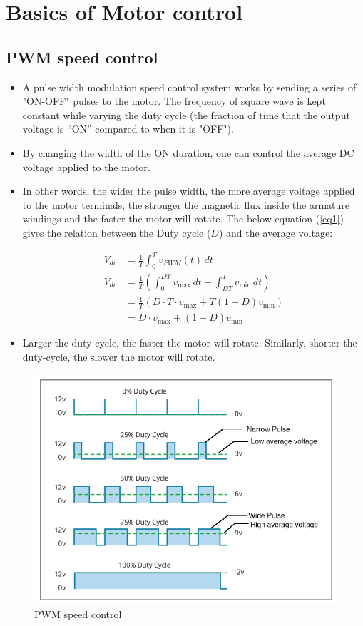 \chapter{Basics of Motor control} \label{Basics_motor_control}

\section{PWM speed control}
\begin{itemize}
    \item A pulse width modulation speed control system works by sending a series of "ON-OFF" pulses to the motor. The frequency of square wave is kept constant while varying the duty cycle (the fraction of time that the output voltage is “ON” compared to when it is "OFF").
    \item By changing the width of the ON duration, one can control the average DC voltage applied to the motor. 
    \item In other words, the wider the pulse width, the more average voltage applied to the motor terminals, the stronger the magnetic flux inside the armature windings and the faster the motor will rotate. The below equation (\ref{eq1}) gives the relation between the Duty cycle ($D$) and the average voltage:

\begin{align}
V_{dc}&={\frac {1}{T}}\int _{0}^{T}v_{PWM}(t)\,dt  \label{eq1} \\
V_{dc} &= {\frac {1}{T}}\left(\int _{0}^{DT}v_{\text{max}}\,dt+\int _{DT}^{T}v_{\text{min}}\,dt\right) \nonumber \\ \nonumber
&={\frac {1}{T}}\left(D\cdot T\cdot v_{\text{max}}+T\left(1-D\right)v_{\text{min}}\right)\\ \nonumber
&=D\cdot v_{\text{max}}+\left(1-D\right)v_{\text{min}} 
\end{align}

    \item Larger the duty-cycle, the faster the motor will rotate. Similarly, shorter the duty-cycle, the slower the motor will rotate.
\end{itemize}

\begin{figure}[h!]
\centering
\includegraphics[width=12cm]{./Figures/PWM_speed_control.png}
\caption{PWM speed control}
\label{BLDC_runner}
\end{figure}

